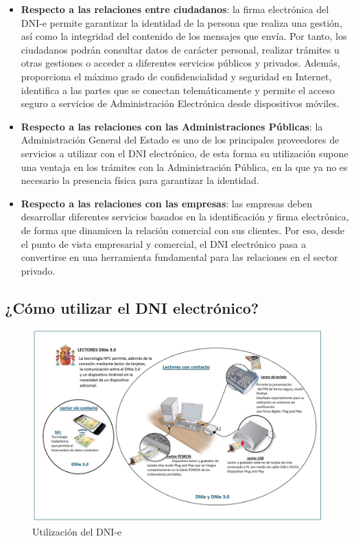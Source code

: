 \documentclass{manual}
\begin{document}
\begin{itemize}
	\item \textbf{Respecto a las relaciones entre ciudadanos}: la firma electrónica del DNI-e permite garantizar la identidad de la persona que realiza una gestión, así como la integridad del contenido de los mensajes que envía. Por tanto, los ciudadanos podrán consultar datos de carácter personal, realizar trámites u otras gestiones o acceder a diferentes servicios públicos y privados. Además, proporciona el máximo grado de confidencialidad y seguridad en Internet, identifica a las partes que se conectan telemáticamente y permite el acceso seguro a servicios de Administración Electrónica desde dispositivos móviles.
	
	\item \textbf{Respecto a las relaciones con las Administraciones Públicas}: la Administración General del Estado es uno de los principales proveedores de servicios a utilizar con el DNI electrónico, de esta forma su utilización supone una ventaja en los trámites con la Administración Pública, en la que ya no es necesario la presencia física para garantizar la identidad.
	
	\item \textbf{Respecto a las relaciones con las empresas}: las empresas deben desarrollar diferentes servicios basados en la identificación y firma electrónica, de forma que dinamicen la relación comercial con sus clientes. Por eso, desde el punto de vista empresarial y comercial, el DNI electrónico pasa a convertirse en una herramienta fundamental para las relaciones en el sector privado.
\end{itemize}


\subsection{¿Cómo utilizar el DNI electrónico?}




\begin{figure}[H]
	\centering
	\includegraphics[width=135mm]{images/lectura}
	\caption{Utilización del DNI-e} 
\end{figure}
\end{document}
